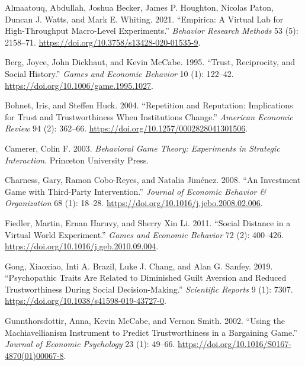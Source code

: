 \documentclass[
]{article}
\newlength{\cslhangindent}
\newenvironment{CSLReferences}[2] %
 {\begin{list}{}{%
  \setlength{\itemindent}{0pt}
  \setlength{\leftmargin}{0pt}
  \setlength{\parsep}{0pt}
  \ifodd #1
   \setlength{\leftmargin}{\cslhangindent}
   \setlength{\itemindent}{-1\cslhangindent}
  \fi
  \setlength{\itemsep}{#2\baselineskip}}}
 {\end{list}}
\begin{document}
\label{refs}
\begin{CSLReferences}{1}{0}
Almaatouq, Abdullah, Joshua Becker, James P. Houghton, Nicolas Paton, Duncan J. Watts, and Mark E. Whiting. 2021. {``{Empirica}: A Virtual Lab for High-Throughput Macro-Level Experiments.''} \emph{Behavior Research Methods} 53 (5): 2158--71. \url{https://doi.org/10.3758/s13428-020-01535-9}.

Berg, Joyce, John Dickhaut, and Kevin McCabe. 1995. {``Trust, Reciprocity, and Social History.''} \emph{Games and Economic Behavior} 10 (1): 122--42. \url{https://doi.org/10.1006/game.1995.1027}.

Bohnet, Iris, and Steffen Huck. 2004. {``Repetition and Reputation: {Implications} for Trust and Trustworthiness When Institutions Change.''} \emph{American Economic Review} 94 (2): 362--66. \url{https://doi.org/10.1257/0002828041301506}.

Camerer, Colin F. 2003. \emph{Behavioral Game Theory: {Experiments} in Strategic Interaction}. Princeton University Press.

Charness, Gary, Ramon Cobo-Reyes, and Natalia Jiménez. 2008. {``An Investment Game with Third-Party Intervention.''} \emph{Journal of Economic Behavior \& Organization} 68 (1): 18--28. \url{https://doi.org/10.1016/j.jebo.2008.02.006}.

Fiedler, Martin, Ernan Haruvy, and Sherry Xin Li. 2011. {``Social Distance in a Virtual World Experiment.''} \emph{Games and Economic Behavior} 72 (2): 400--426. \url{https://doi.org/10.1016/j.geb.2010.09.004}.

Gong, Xiaoxiao, Inti A. Brazil, Luke J. Chang, and Alan G. Sanfey. 2019. {``Psychopathic Traits Are Related to Diminished Guilt Aversion and Reduced Trustworthiness During Social Decision-Making.''} \emph{Scientific Reports} 9 (1): 7307. \url{https://doi.org/10.1038/s41598-019-43727-0}.

Gunnthorsdottir, Anna, Kevin McCabe, and Vernon Smith. 2002. {``Using the {Machiavellianism} Instrument to Predict Trustworthiness in a Bargaining Game.''} \emph{Journal of Economic Psychology} 23 (1): 49--66. \url{https://doi.org/10.1016/S0167-4870(01)00067-8}.


\end{CSLReferences}
\end{document}
